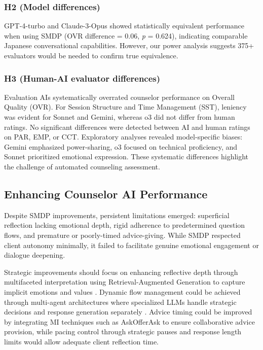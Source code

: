 \documentclass{wiley-article}
\begin{document}
\subsubsection*{H2 (Model differences)}
GPT-4-turbo and Claude-3-Opus showed statistically equivalent performance when using SMDP (OVR difference = 0.06, \emph{p} = 0.624), indicating comparable Japanese conversational capabilities. However, our power analysis suggests 375+ evaluators would be needed to confirm true equivalence.

\subsubsection*{H3 (Human-AI evaluator differences)}
Evaluation AIs systematically overrated counselor performance on Overall Quality (OVR). For Session Structure and Time Management (SST), leniency was evident for Sonnet and Gemini, whereas o3 did not differ from human ratings. No significant differences were detected between AI and human ratings on PAR, EMP, or CCT. Exploratory analyses revealed model-specific biases: Gemini emphasized power-sharing, o3 focused on technical proficiency, and Sonnet prioritized emotional expression. These systematic differences highlight the challenge of automated counseling assessment.

\subsection*{Enhancing Counselor AI Performance}

Despite SMDP improvements, persistent limitations emerged: superficial reflection lacking emotional depth, rigid adherence to predetermined question flows, and premature or poorly-timed advice-giving. While SMDP respected client autonomy minimally, it failed to facilitate genuine emotional engagement or dialogue deepening.

Strategic improvements should focus on enhancing reflective depth through multifaceted interpretation using Retrieval-Augmented Generation to capture implicit emotions and values \citep{arabiHabitCoachCustomising2024}. Dynamic flow management could be achieved through multi-agent architectures where specialized LLMs handle strategic decisions and response generation separately \citep{xuAutoCBTAutonomousMultiagent2025, kampmanMultiAgentDualDialogue2024}. Advice timing could be improved by integrating MI techniques such as Ask\textendash{}Offer\textendash{}Ask to ensure collaborative advice provision, while pacing control through strategic pauses and response length limits would allow adequate client reflection time.
\end{document}
